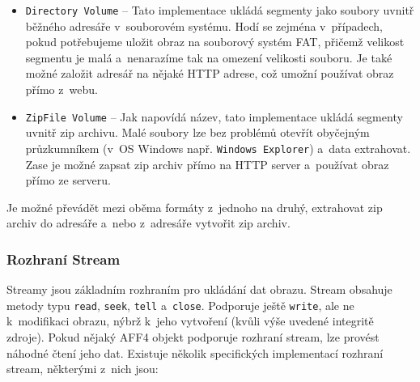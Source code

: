 \begin{itemize}
\item \texttt{Directory Volume} -- Tato implementace ukládá segmenty jako soubory uvnitř běžného adresáře v~souborovém systému. Hodí se zejména v~případech, pokud potřebujeme uložit obraz na souborový systém FAT, přičemž velikost segmentu je malá a~nenarazíme tak na omezení velikosti souboru. Je také možné založit adresář na nějaké HTTP adrese, což umožní používat obraz přímo z~webu.

\item \texttt{ZipFile Volume} -- Jak napovídá název, tato implementace ukládá segmenty uvnitř zip archivu. Malé soubory lze bez problémů otevřít obyčejným průzkumníkem (v~OS Windows např. \texttt{Windows Explorer}) a~data extrahovat. Zase je možné zapsat zip archiv přímo na HTTP server a~používat obraz přímo ze serveru.
\end{itemize}

\noindent Je možné převádět mezi oběma formáty z~jednoho na druhý, extrahovat zip archiv do adresáře a~nebo z~adresáře vytvořit zip archiv.

\subsubsection{Rozhraní Stream}
Streamy jsou základním rozhraním pro ukládání dat obrazu. Stream obsahuje metody typu \texttt{read}, \texttt{seek}, \texttt{tell} a~\texttt{close}. Podporuje ještě \texttt{write}, ale ne k~modifikaci obrazu, nýbrž k~jeho vytvoření (kvůli výše uvedené integritě zdroje). Pokud nějaký AFF4 objekt podporuje rozhraní stream, lze provést náhodné čtení jeho dat. Existuje několik specifických implementací rozhraní stream, některými z~nich jsou:

